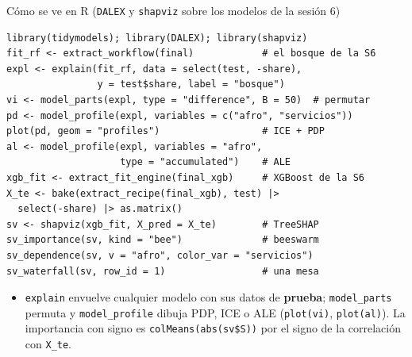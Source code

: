 \documentclass{beamer}
\newcommand{\1}{\mathbb{I}}
\begin{document}
\begin{frame}[fragile]{Cómo se ve en R (\texttt{DALEX} y \texttt{shapviz} sobre los modelos de la sesión 6)}
\scriptsize
\begin{verbatim}
library(tidymodels); library(DALEX); library(shapviz)
fit_rf <- extract_workflow(final)            # el bosque de la S6
expl <- explain(fit_rf, data = select(test, -share),
                y = test$share, label = "bosque")
vi <- model_parts(expl, type = "difference", B = 50)  # permutar
pd <- model_profile(expl, variables = c("afro", "servicios"))
plot(pd, geom = "profiles")                  # ICE + PDP
al <- model_profile(expl, variables = "afro",
                    type = "accumulated")    # ALE
xgb_fit <- extract_fit_engine(final_xgb)     # XGBoost de la S6
X_te <- bake(extract_recipe(final_xgb), test) |>
  select(-share) |> as.matrix()
sv <- shapviz(xgb_fit, X_pred = X_te)        # TreeSHAP
sv_importance(sv, kind = "bee")              # beeswarm
sv_dependence(sv, v = "afro", color_var = "servicios")
sv_waterfall(sv, row_id = 1)                 # una mesa
\end{verbatim}
\normalsize
\small
\begin{itemize}\itemsep2pt
  \item \texttt{explain} envuelve cualquier modelo con sus datos de \textbf{prueba}; \texttt{model\_parts} permuta y \texttt{model\_profile} dibuja PDP, ICE o ALE (\texttt{plot(vi)}, \texttt{plot(al)}). La importancia con signo es \texttt{colMeans(abs(sv\$S))} por el signo de la correlación con \texttt{X\_te}.
\end{itemize}
\end{frame}
\end{document}
